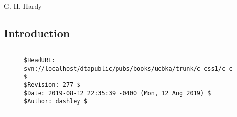
\chapter{\ccssonelongtitle{}}

\label{ccss1}

                   {G. H. Hardy \cite[p.85]{bibref:b:mathematiciansapology:1940}}

\section{Introduction}
\label{ccss1:sint}



\noindent\begin{figure}[!b]
\noindent\rule[-0.25in]{\textwidth}{1pt}
\begin{tiny}
\begin{verbatim}
$HeadURL: svn://localhost/dtapublic/pubs/books/ucbka/trunk/c_css1/c_css1.tex $
$Revision: 277 $
$Date: 2019-08-12 22:35:39 -0400 (Mon, 12 Aug 2019) $
$Author: dashley $
\end{verbatim}
\end{tiny}
\noindent\rule[0.25in]{\textwidth}{1pt}
\end{figure}

%
